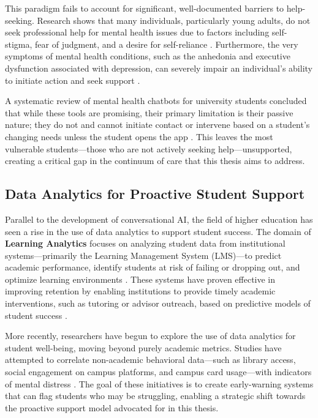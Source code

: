 This paradigm fails to account for significant, well-documented barriers to help-seeking. Research shows that many individuals, particularly young adults, do not seek professional help for mental health issues due to factors including self-stigma, fear of judgment, and a desire for self-reliance \cite{FIND_CITATION_PLEASE}. Furthermore, the very symptoms of mental health conditions, such as the anhedonia and executive dysfunction associated with depression, can severely impair an individual's ability to initiate action and seek support \cite{FIND_CITATION_PLEASE}.

A systematic review of mental health chatbots for university students concluded that while these tools are promising, their primary limitation is their passive nature; they do not and cannot initiate contact or intervene based on a student's changing needs unless the student opens the app \cite{FIND_CITATION_PLEASE}. This leaves the most vulnerable students—those who are not actively seeking help—unsupported, creating a critical gap in the continuum of care that this thesis aims to address.


\subsection{Data Analytics for Proactive Student Support}

Parallel to the development of conversational AI, the field of higher education has seen a rise in the use of data analytics to support student success. The domain of \textbf{Learning Analytics} focuses on analyzing student data from institutional systems—primarily the Learning Management System (LMS)—to predict academic performance, identify students at risk of failing or dropping out, and optimize learning environments \cite{FIND_CITATION_PLEASE}. These systems have proven effective in improving retention by enabling institutions to provide timely academic interventions, such as tutoring or advisor outreach, based on predictive models of student success \cite{FIND_CITATION_PLEASE}.

More recently, researchers have begun to explore the use of data analytics for student well-being, moving beyond purely academic metrics. Studies have attempted to correlate non-academic behavioral data—such as library access, social engagement on campus platforms, and campus card usage—with indicators of mental distress \cite{FIND_CITATION_PLEASE}. The goal of these initiatives is to create early-warning systems that can flag students who may be struggling, enabling a strategic shift towards the proactive support model advocated for in this thesis.

